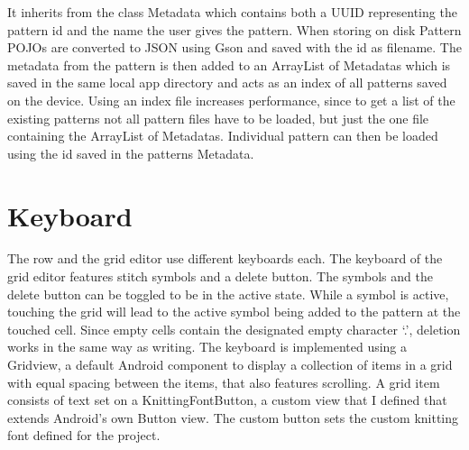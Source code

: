\documentclass[a4paper,11pt]{kth-mag}
\begin{document}
It inherits from the class Metadata which contains both a UUID representing the pattern id and the name the user gives the pattern. When storing on disk Pattern POJOs are converted to JSON using Gson and saved with the id as filename. The metadata from the pattern is then added to an ArrayList of Metadatas which is saved in the same local app directory and acts as an index of all patterns saved on the device. Using an index file increases performance, since to get a list of the existing patterns not all pattern files have to be loaded, but just the one file containing the ArrayList of Metadatas. Individual pattern can then be loaded using the id saved in the patterns Metadata.

\section{Keyboard}
The row and the grid editor use different keyboards each. The keyboard of the grid editor features stitch symbols and a delete button. The symbols and the delete button can be toggled to be in the active state. While a symbol is active, touching the grid will lead to the active symbol being added to the pattern at the touched cell. Since empty cells contain the designated empty character ‘.’, deletion works in the same way as writing. The keyboard is implemented using a Gridview, a default Android component to display a collection of items in a grid with equal spacing between the items, that also features scrolling. A grid item consists of text set on a KnittingFontButton, a custom view that I defined that extends Android’s own Button view. The custom button sets the custom knitting font defined for the project.
\end{document}
